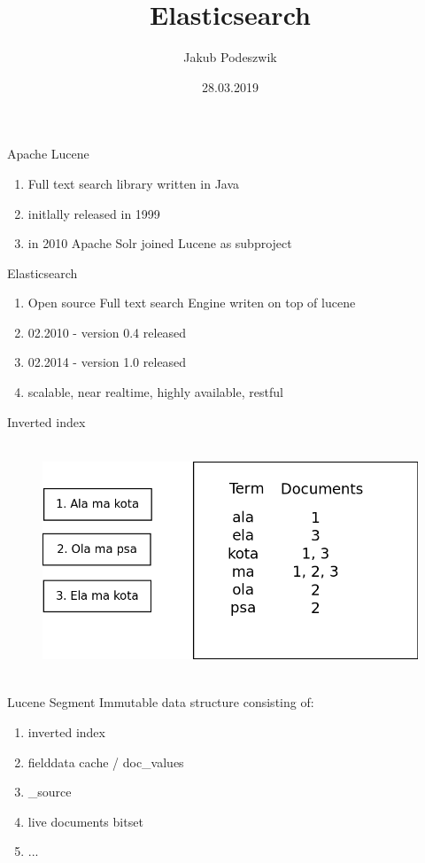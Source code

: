 \documentclass{beamer}
\title[Elasticsearch]{Elasticsearch}
\author{Jakub Podeszwik}
\institute{Yameo}
\date{28.03.2019}
\begin{document}
\begin{frame}
  \titlepage
\end{frame}

\begin{frame}{Apache Lucene}
	\begin{enumerate}
		\item Full text search library written in Java
		\item initlally released in 1999
		\item in 2010 Apache Solr joined Lucene as subproject
	\end{enumerate}
\end{frame}
\begin{frame}{Elasticsearch}
	\begin{enumerate}
		\item Open source Full text search Engine writen on top of lucene
		\item 02.2010 - version 0.4 released
		\item 02.2014 - version 1.0 released
		\item scalable, near realtime, highly available, restful
	\end{enumerate}
\end{frame}
\begin{frame}{Inverted index}
	\begin{figure}
		\includegraphics[width=\textwidth,height=7cm,keepaspectratio=true]{inverted-index}
	\end{figure}
\end{frame}

\begin{frame}{Lucene Segment}
	Immutable data structure consisting of:
	\begin{enumerate}
		\item inverted index
		\item fielddata cache / doc\_values
		\item \_source
		\item live documents bitset
		\item ...	
	\end{enumerate}
\end{frame}
\end{document}
